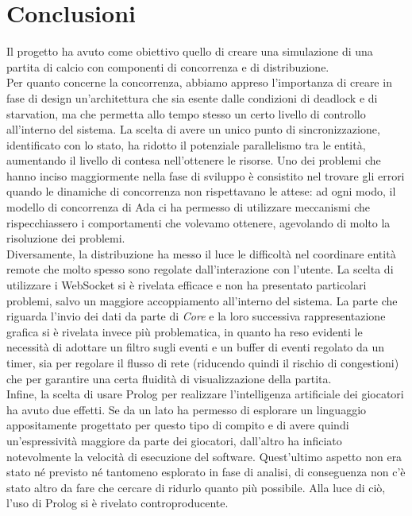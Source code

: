 
\section{Conclusioni}
\label{sec:conclusioni}

Il progetto ha avuto come obiettivo quello di creare una simulazione di una partita di calcio con componenti di concorrenza e di distribuzione.\\

Per quanto concerne la concorrenza, abbiamo appreso l'importanza di creare in fase di design un'architettura che sia esente dalle condizioni di deadlock e di starvation, ma che permetta allo tempo stesso un certo livello di controllo all'interno del sistema. La scelta di avere un unico punto di sincronizzazione, identificato con lo stato, ha ridotto il potenziale parallelismo tra le entità, aumentando il livello di contesa nell'ottenere le risorse. Uno dei problemi che hanno inciso maggiormente nella fase di sviluppo è consistito nel trovare gli errori quando le dinamiche di concorrenza non rispettavano le attese: ad ogni modo, il modello di concorrenza di Ada ci ha permesso di utilizzare meccanismi che rispecchiassero i comportamenti che volevamo ottenere, agevolando di molto la risoluzione dei problemi.\\

Diversamente, la distribuzione ha messo il luce le difficoltà nel coordinare entità remote che molto spesso sono regolate dall'interazione con l'utente. La scelta di utilizzare i WebSocket si è rivelata efficace e non ha presentato particolari problemi, salvo un maggiore accoppiamento all'interno del sistema. La parte che riguarda l'invio dei dati da parte di \emph{Core} e la loro successiva rappresentazione grafica si è rivelata invece più problematica, in quanto ha reso evidenti le necessità di adottare un filtro sugli eventi e un buffer di eventi regolato da un timer, sia per regolare il flusso di rete (riducendo quindi il rischio di congestioni) che per garantire una certa fluidità di visualizzazione della partita.\\

Infine, la scelta di usare Prolog per realizzare l'intelligenza artificiale dei giocatori ha avuto due effetti. Se da un lato ha permesso di esplorare un linguaggio appositamente progettato per questo tipo di compito e di avere quindi un'espressività maggiore da parte dei giocatori, dall'altro ha inficiato notevolmente la velocità di esecuzione del software. Quest'ultimo aspetto non era stato né previsto né tantomeno esplorato in fase di analisi, di conseguenza non c'è stato altro da fare che cercare di ridurlo quanto più possibile. Alla luce di ciò, l'uso di Prolog si è rivelato controproducente.\\